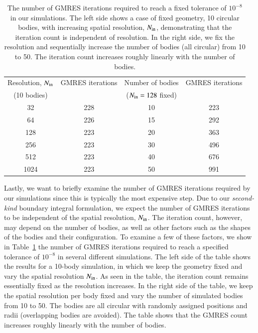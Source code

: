 \documentclass[preprint, 10pt]{elsarticle}
\begin{document}
\begin{table}%
\begin{center}
\caption{The number of GMRES iterations required to reach a fixed tolerance of $10^{-8}$ in our simulations. The left side shows a case of fixed geometry, 10 circular bodies, with increasing spatial resolution, $N_{\mathrm{in}}$, demonstrating that the iteration count is independent of resolution. In the right side, we fix the resolution and sequentially increase the number of bodies (all circular) from 10 to 50. The iteration count increases roughly linearly with the number of bodies.  }
\vspace{0.3 pc}
\label{itertab}
\begin{tabular}{c c | c c}
\hline
\hspace{0.5pc} Resolution, $N_{\mathrm{in}}$
\hspace{0.5pc} & GMRES iterations 
\hspace{0.5pc} &  Number of bodies
\hspace{0.5pc} & GMRES iterations  \\
\hspace{0.0pc} (10 bodies) &
\hspace{0.5pc} & ($N_{\mathrm{in}} = 128$ fixed) & \\
\hline
%
32	& 228	& 10 	& 223	\\
64    	& 226	& 15 	& 292	\\
128	& 223	& 20 	& 363	\\
256	& 223	& 30 	& 496	\\
512	& 223	& 40 	& 676	\\
1024	& 223	& 50 	& 991	\\
%
\hline
\end{tabular}
\end{center}
\end{table}

Lastly, we want to briefly examine the number of GMRES iterations required by our simulations since this is typically the most expensive step. Due to our {\em second-kind} boundary integral formulation, we expect the number of GMRES iterations to be independent of the spatial resolution, $N_{\mathrm{in}}$. The iteration count, however, may depend on the number of bodies, as well as other factors such as the shapes of the bodies and their configuration. To examine a few of these factors, we show in Table~\ref{itertab} the number of GMRES iterations required to reach a specified tolerance of $10^{-8}$ in several different simulations. The left side of the table shows the results for a 10-body simulation, in which we keep the geometry fixed and vary the spatial resolution $N_{\mathrm{in}}$. As seen in the table, the iteration count remains essentially fixed as the resolution increases. In the right side of the table, we keep the spatial resolution per body fixed and vary the number of simulated bodies from 10 to 50. The bodies are all circular with randomly assigned positions and radii (overlapping bodies are avoided). The table shows that the GMRES count increases roughly linearly with the number of bodies. 
\end{document}
